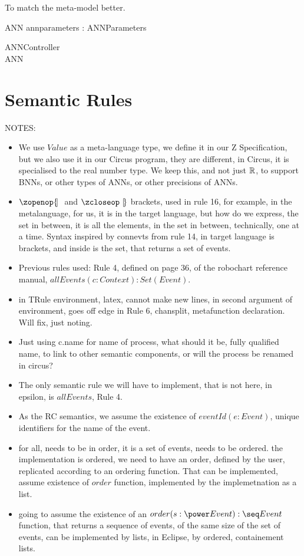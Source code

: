 \documentclass{article}
\begin{document}
To match the meta-model better. 
\begin{schema}{ANN} 
   annparameters : ANNParameters
\end{schema} 

\begin{schema}{ANNController}
\\
ANN
\end{schema}

\section{Semantic Rules}
NOTES:
\begin{itemize} 
  \item We use $Value$ as a meta-language type, we define it in our Z Specification, but we also use it in our Circus program, they are different, in Circus, it is specialised to the real number type. We keep this, and not just $\mathbb{R}$, to support BNNs, or other types of ANNs, or other precisions of ANNs. 
  \item $\lchanset$ and $\rchanset$ brackets, used in rule 16, for example, in the metalanguage, for us, it is in the target language, but how do we express, the set in between, it is all the elements, in the set in between, technically, one at a time. Syntax inspired by connevts from rule 14, in target language is brackets, and inside is the set, that returns a set of events. 
  \item Previous rules used: Rule 4, defined on page 36, of the robochart reference manual, $allEvents(c : Context) : Set(Event)$. 
  \item in TRule environment, latex, cannot make new lines, in second argument of environment, goes off edge in Rule 6, chansplit, metafunction declaration. Will fix, just noting. 
  \item Just using c.name for name of process, what should it be, fully qualified name, to link to other semantic components, or will the process be renamed in circus? 
  \item The only semantic rule we will have to implement, that is not here, in epsilon, is $allEvents$, Rule 4.
  \item As the RC semantics, we assume the existence of $eventId(e: Event)$, unique identifiers for the name of the event. 
  \item for all, needs to be in order, it is a set of events, needs to be ordered. the implementation is ordered, we need to have an order, defined by the user, replicated according to an ordering function. That can be implemented, assume existence of $order$ function, implemented by the implemetnation as a list. 
  \item going to assume the existence of an $order(s : \power Event): \seq Event$ function, that returns a sequence of events, of the same size of the set of events, can be implemented by lists, in Eclipse, by ordered, containement lists. 
\end{itemize} 
\end{document}
